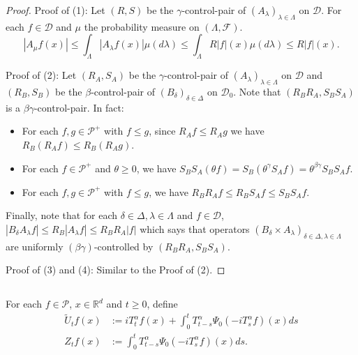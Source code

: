 \documentclass[12pt]{amsart}
\theoremstyle{plain}
\theoremstyle{definition}
\numberwithin{equation}{section}
\begin{document}
\begin{proof}
    Proof of (1): Let $(R,S)$ be the $\gamma$-control-pair of $(A_\lambda)_{\lambda\in\Lambda}$ on $\mathcal{D}$. For each $f \in \mathcal{D}$ and $\mu$ the probability measure on $(\Lambda, \mathscr F)$.
\[
   |A_{\mu}f(x)|\leq \int_{\Lambda}|A_{\lambda}f(x)|\mu(d\lambda) \leq \int_{\Lambda}R|f|(x)\mu(d\lambda) \leq R|f|(x).
\]

   	Proof of (2): Let $(R_A, S_A)$ be the $\gamma$-control-pair of $(A_\lambda)_{\lambda\in\Lambda}$ on $\mathcal{D}$ and $(R_B, S_B)$ be the $\beta$-control-pair of $(B_{\delta})_{\delta\in\Delta}$ on $\mathcal{D}_0$.
	Note that $(R_BR_A, S_BS_A)$ is a $\beta \gamma$-control-pair.
	In fact:
\begin{itemize}
\item
	For each $f,g \in \mathcal P^+$ with $f\leq g$, since $R_Af \leq R_A g$ we have $R_B(R_A f)\leq R_B(R_A g)$.
\item
	For each $f\in \mathcal{P}^+$ and $\theta \geq 0$, we have $S_BS_A(\theta f)=S_B(\theta^{\gamma}S_Af)=\theta^{\beta\gamma}S_BS_Af$.
\item
	For each $f,g \in \mathcal P^+$ with $f\leq g$, we have $R_B R_A f \leq R_B S_A f \leq S_BS_A f$.
\end{itemize}
	Finally, note that for each $\delta\in \Delta, \lambda\in\Lambda$ and $f\in \mathcal D$, $|B_{\delta}A_{\lambda}f|\leq R_B|A_{\lambda}f|\leq R_BR_A|f|$ which says that operators $(B_\delta\times A_\lambda)_{\delta \in \Delta, \lambda \in \Lambda}$ are uniformly $(\beta\gamma)$-controlled by $(R_BR_A,S_BS_A)$.

   Proof of (3) and (4): Similar to the Proof of (2).
\end{proof}
\subsection{}
    For each $f \in \mathcal{P}$, $x\in \mathbb{R}^d$ and $t\geq 0$, define
\begin{align}
\label{eq: def of Zf}
    \tilde U_t f(x)
    &:= i T^\alpha_t f(x) + \int_0^t T^\alpha_{t-s} \Psi_0(-i T_s^{\alpha}f)(x)ds
    \\Z_t f (x)
    &:= \int_0^t T^\alpha_{t-s} \Psi_0(-i T_s^{\alpha}f)(x)ds.
\end{align}
\end{document}
